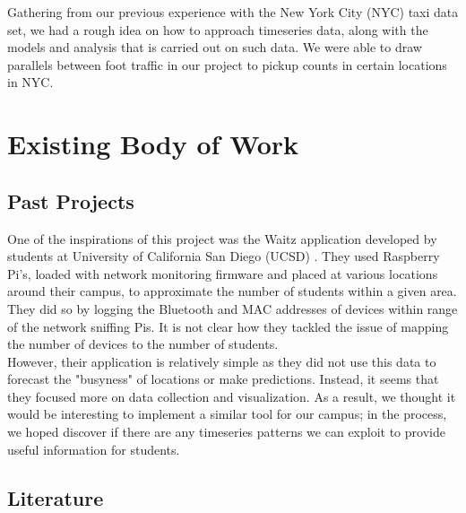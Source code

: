 \documentclass[journal, 11pt]{IEEEtran}
\begin{document}
\noindent Gathering from our previous experience with the New York City (NYC) taxi data set, we had a rough idea on how to approach timeseries data, along with the models and analysis that is carried out on such data. We were able to draw parallels between foot traffic in our project to pickup counts in certain locations in NYC.


\section{Existing Body of Work}

\subsection{Past Projects}

\noindent One of the inspirations of this project was the Waitz application developed by students at University of California San Diego (UCSD) \cite{waitz}. They used Raspberry Pi's, loaded with network monitoring firmware and placed at various locations around their campus, to approximate the number of students within a given area. They did so by logging the Bluetooth and MAC addresses of devices within range of the network sniffing Pis. It is not clear how they tackled the issue of mapping the number of devices to the number of students.\\


\noindent However, their application is relatively simple as they did not use this data to forecast the "busyness" of locations or make predictions. Instead, it seems that they focused more on data collection and visualization. As a result, we thought it would be interesting to implement a similar tool for our campus; in the process, we hoped discover if there are any timeseries patterns we can exploit to provide useful information for students.

\subsection{Literature}
\end{document}
